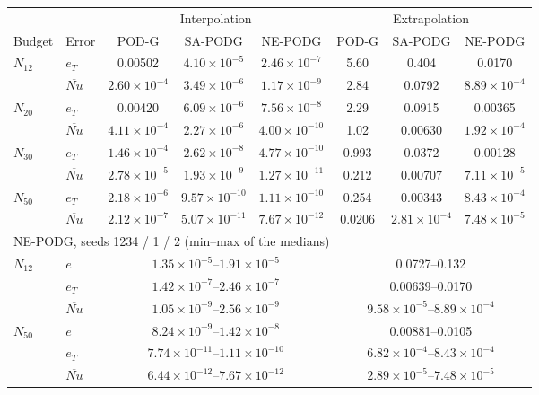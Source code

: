 \begin{tabular}{llcccccc}
\toprule
 & & \multicolumn{3}{c}{Interpolation} & \multicolumn{3}{c}{Extrapolation} \\
\cmidrule(lr){3-5}\cmidrule(lr){6-8}
Budget & Error & POD-G & SA-PODG & NE-PODG & POD-G & SA-PODG & NE-PODG \\
\midrule
$N_{12}$ & $e_T$ & 0.00502 & $4.10\times10^{-5}$ & $2.46\times10^{-7}$ & 5.60 & 0.404 & 0.0170 \\
 & $\overline{Nu}$ & $2.60\times10^{-4}$ & $3.49\times10^{-6}$ & $1.17\times10^{-9}$ & 2.84 & 0.0792 & $8.89\times10^{-4}$ \\
\midrule
$N_{20}$ & $e_T$ & 0.00420 & $6.09\times10^{-6}$ & $7.56\times10^{-8}$ & 2.29 & 0.0915 & 0.00365 \\
 & $\overline{Nu}$ & $4.11\times10^{-4}$ & $2.27\times10^{-6}$ & $4.00\times10^{-10}$ & 1.02 & 0.00630 & $1.92\times10^{-4}$ \\
\midrule
$N_{30}$ & $e_T$ & $1.46\times10^{-4}$ & $2.62\times10^{-8}$ & $4.77\times10^{-10}$ & 0.993 & 0.0372 & 0.00128 \\
 & $\overline{Nu}$ & $2.78\times10^{-5}$ & $1.93\times10^{-9}$ & $1.27\times10^{-11}$ & 0.212 & 0.00707 & $7.11\times10^{-5}$ \\
\midrule
$N_{50}$ & $e_T$ & $2.18\times10^{-6}$ & $9.57\times10^{-10}$ & $1.11\times10^{-10}$ & 0.254 & 0.00343 & $8.43\times10^{-4}$ \\
 & $\overline{Nu}$ & $2.12\times10^{-7}$ & $5.07\times10^{-11}$ & $7.67\times10^{-12}$ & 0.0206 & $2.81\times10^{-4}$ & $7.48\times10^{-5}$ \\
\midrule
\multicolumn{8}{l}{NE-PODG, seeds 1234 / 1 / 2 (min--max of the medians)} \\
$N_{12}$ & $e$ & \multicolumn{3}{c}{$1.35\times10^{-5}$--$1.91\times10^{-5}$} & \multicolumn{3}{c}{0.0727--0.132} \\
 & $e_T$ & \multicolumn{3}{c}{$1.42\times10^{-7}$--$2.46\times10^{-7}$} & \multicolumn{3}{c}{0.00639--0.0170} \\
 & $\overline{Nu}$ & \multicolumn{3}{c}{$1.05\times10^{-9}$--$2.56\times10^{-9}$} & \multicolumn{3}{c}{$9.58\times10^{-5}$--$8.89\times10^{-4}$} \\
$N_{50}$ & $e$ & \multicolumn{3}{c}{$8.24\times10^{-9}$--$1.42\times10^{-8}$} & \multicolumn{3}{c}{0.00881--0.0105} \\
 & $e_T$ & \multicolumn{3}{c}{$7.74\times10^{-11}$--$1.11\times10^{-10}$} & \multicolumn{3}{c}{$6.82\times10^{-4}$--$8.43\times10^{-4}$} \\
 & $\overline{Nu}$ & \multicolumn{3}{c}{$6.44\times10^{-12}$--$7.67\times10^{-12}$} & \multicolumn{3}{c}{$2.89\times10^{-5}$--$7.48\times10^{-5}$} \\
\bottomrule
\end{tabular}
